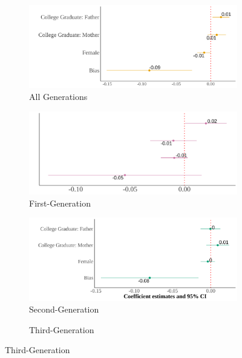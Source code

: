 \begin{center}
\begin{figure}[!htb]
\centering
\caption{Relationship Between Self-Reported Asian Identity and Bias: By Generation}
\label{plot01-regression-gen}
\begin{subfigure}{.48\textwidth}
\caption{All Generations}
\centering
\includegraphics[width=.9\linewidth]{skin-iat-regression-all-gens.png}
\end{subfigure}
\centering
\begin{subfigure}{.48\textwidth}
\caption{First-Generation}
\centering
\includegraphics[width=.9\linewidth]{skin-iat-regression-first-gen.png}
\end{subfigure}
\begin{subfigure}{.48\textwidth}
\caption{Second-Generation}
\centering
\includegraphics[width=.9\linewidth]{skin-iat-regression-second-gen.png}
\end{subfigure}
\begin{subfigure}{.48\textwidth}
\caption{Third-Generation}
\centering

\end{subfigure}
\end{figure}
\end{center}
